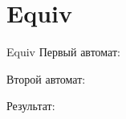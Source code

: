 \section{Equiv}
\begin{frame}{Equiv}
	Первый автомат:


	Второй автомат:


	Результат:

\end{frame}
